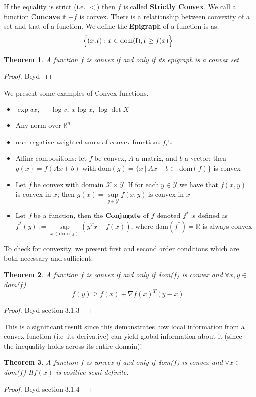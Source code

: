 \documentclass[]{article}
\theoremstyle{mattstyle}
\newtheorem{theorem}{Theorem}[section]
\theoremstyle{definition}
\begin{document}
If the equality is strict (i.e. $<$) then $f$ is called \textbf{Strictly Convex}. We call a function \textbf{Concave} if $-f$ is convex. There is a relationship between convexity of a set and that of a function. We define the \textbf{Epigraph} of a function is as:
$$\Bigl\{ (x,t): x\in \text{dom(f)}, t\ge f(x) \Bigr\}$$
\begin{theorem}
	A function $f$ is convex if and only if its epigraph is a convex set
\end{theorem}
\begin{proof}
	Boyd \cite{Boyd:2004:CO:993483} 
\end{proof}
\newpage
We present some examples of Convex functions.
\begin{itemize}
	\item $\exp{ax}, \ -\log x, \ x\log x, \ \log \det X$
	\item Any norm over $\mathbb{R}^n$
	\item non-negative weighted sums of convex functions $f_i$'s
	\item Affine compositions: let $f$ be convex, $A$ a matrix, and $b$ a vector; then $g(x) = f(Ax+b)$ with dom$(g)=\{x \ |\ Ax+b\in$ dom$(f)\}$ is convex
	\item Let $f$ be convex with domain $\mathcal{X} \times \mathcal{Y}$. If for each $y \in \mathcal{Y}$ we have that $f(x,y)$ is convex in $x$; then $ g(x) = \sup\limits_{y \in \mathcal{Y}} f(x,y) \ \text{is convex in $x$}$
	\item Let $f$ be a function, then the \textbf{Conjugate} of $f$ denoted $f^*$ is defined as $f^*(y):=\sup\limits_{x\in \text{dom}(f)}(y^Tx-f(x))\text{,  where dom$(f^*)=\mathbb{R}$}$ is always convex
\end{itemize}

To check for convexity, we present first and second order conditions which are both necessary and sufficient:
\begin{theorem}
	A function $f$ is convex if and only if dom($f$) is convex and $\forall x,y \in$dom($f$)
	$$ f(y) \ge f(x) + \nabla f(x)^T(y-x)$$
\end{theorem}
\begin{proof}
	Boyd section 3.1.3 \cite{Boyd:2004:CO:993483} 
\end{proof}
This is a significant result since this demonstrates how local information from a convex function (i.e. its derivative) can yield global information about it (since the inequality holds across its entire domain)!
\begin{theorem}
	A function $f$ is convex if and only if dom($f$) is convex and $\forall x \in$dom($f$) $Hf(x)$ is positive semi definite.
\end{theorem}
\begin{proof}
	Boyd section 3.1.4 \cite{Boyd:2004:CO:993483} 
\end{proof}
\end{document}
